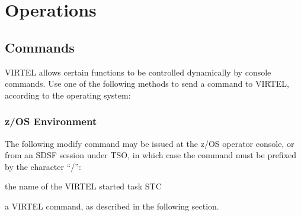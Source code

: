 \documentclass[letterpaper,10pt,english]{sphinxmanual}
\begin{document}
\chapter{Operations}
\label{\detokenize{audit_operations_ and_performance:operations}}\label{\detokenize{audit_operations_ and_performance:v462ap-introduction}}
\ignorespaces 

\section{Commands}
\label{\detokenize{audit_operations_ and_performance:commands}}\label{\detokenize{audit_operations_ and_performance:index-0}}
\sphinxAtStartPar
VIRTEL allows certain functions to be controlled dynamically by console commands. Use one of the following methods to send a command to VIRTEL, according to the operating system:

\ignorespaces 

\subsection{z/OS Environment}
\label{\detokenize{audit_operations_ and_performance:z-os-environment}}\label{\detokenize{audit_operations_ and_performance:index-1}}
\sphinxAtStartPar
The following modify command may be issued at the z/OS operator console, or from an SDSF session under TSO, in which case the command must be prefixed by the character “/”:

\begin{sphinxVerbatim}[commandchars=\\\{\}]
 
\end{sphinxVerbatim}
\begin{description}
\sphinxAtStartPar
the name of the VIRTEL started task STC

\sphinxAtStartPar
a VIRTEL command, as described in the following section.

\end{description}

\ignorespaces 
\end{document}
